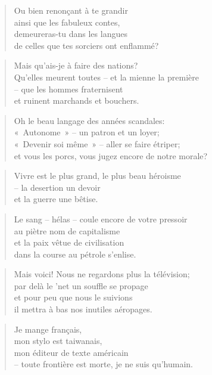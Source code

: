   \begin{verse}
    Ou bien renonçant à te grandir\\
    ainsi que les fabuleux contes,\\
    demeureras-tu dans les langues\\
    de celles que tes sorciers ont enflammé?
  \end{verse}
  \begin{verse}
    Mais qu’ais-je à faire des nations?	\\
    Qu’elles meurent toutes -- et la mienne la première\\
    -- que les hommes fraternisent\\
    et ruinent marchands et bouchers.
  \end{verse}
  \begin{verse}
    Oh le beau langage des années scandales:\\
    «~Autonome~» -- un patron et un loyer;\\
    «~Devenir soi même~» -- aller se faire étriper;\\
    et vous les porcs, vous jugez encore de notre morale?
  \end{verse}
  \begin{verse}
    Vivre est le plus grand, le plus beau héroisme\\
    -- la desertion un devoir\\
    et la guerre une bêtise. 
  \end{verse}
  \begin{verse}
    Le sang -- hélas -- coule encore de votre pressoir\\
    au piètre nom de capitalisme\\
    et la paix vêtue de civilisation\\
    dans la course au pétrole s’enlise.
  \end{verse}
  \begin{verse}
    Mais voici! Nous ne regardons plus la télévision;\\
    par delà le ’net un souffle se propage\\
    et pour peu que nous le suivions\\
    il mettra à bas nos inutiles aéropages.
  \end{verse}
  \begin{verse}
    Je mange français,\\
    mon stylo est taiwanais,\\
    mon éditeur de texte américain\\
    -- toute frontière est morte, je ne suis qu’humain.
  \end{verse}
